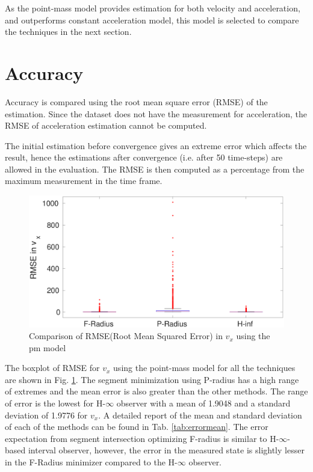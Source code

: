 As the point-mass model provides estimation for both velocity and acceleration, and outperforms constant acceleration model, this model is selected to compare the techniques in the next section.

\section{Accuracy}
Accuracy is compared using the root mean square error (RMSE) of the estimation. Since the dataset does not have the measurement for acceleration, the RMSE of acceleration estimation cannot be computed.

The initial estimation before convergence gives an extreme error which affects the result, hence the estimations after convergence (i.e. after 50 time-steps) are allowed in the evaluation. The RMSE is then computed as a percentage from the maximum measurement in the time frame.

\begin{figure}[h]
\centering
\includegraphics[width=\linewidth]{figures/Error/boxplotall}
\caption{Comparison of RMSE(Root Mean Squared Error) in $v_x$ using the pm model}
\label{fig:boxplot}
\end{figure}

The boxplot of RMSE for $v_x$ using the point-mass model for all the techniques are shown in Fig. \ref{fig:boxplot}. The segment minimization using P-radius has a high range of extremes and the mean error is also greater than the other methods. The range of error is the lowest for H-$\infty$ observer with a mean of 1.9048 and a standard deviation of 1.9776 for $v_x$. A detailed report of the mean and standard deviation of each of the methods can be found in Tab. \ref{tab:errormean}. The error expectation from segment intersection optimizing F-radius is similar to H-$\infty$-based interval observer, however, the error in the measured state is slightly lesser in the F-Radius minimizer compared to the H-$\infty$ observer.


